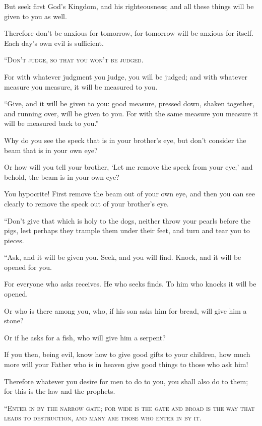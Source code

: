 But seek first God’s Kingdom, and his righteousness; and all these things will be given to you as well.

Therefore don’t be anxious for tomorrow, for tomorrow will be anxious for itself. Each day’s own evil is sufficient.




\lettrine{“}{Don’t judge, so that you won’t be judged.}

For with whatever judgment you judge, you will be judged; and with whatever measure you measure, it will be measured to you.

“Give, and it will be given to you: good measure, pressed down, shaken together, and running over, will be given to you. For with the same measure you measure it will be measured back to you.”

Why do you see the speck that is in your brother’s eye, but don’t consider the beam that is in your own eye?

Or how will you tell your brother, ‘Let me remove the speck from your eye;’ and behold, the beam is in your own eye?

You hypocrite! First remove the beam out of your own eye, and then you can see clearly to remove the speck out of your brother’s eye.

“Don’t give that which is holy to the dogs, neither throw your pearls before the pigs, lest perhaps they trample them under their feet, and turn and tear you to pieces.

“Ask, and it will be given you. Seek, and you will find. Knock, and it will be opened for you.

For everyone who asks receives. He who seeks finds. To him who knocks it will be opened.

Or who is there among you, who, if his son asks him for bread, will give him a stone?

Or if he asks for a fish, who will give him a serpent?

If you then, being evil, know how to give good gifts to your children, how much more will your Father who is in heaven give good things to those who ask him!

Therefore whatever you desire for men to do to you, you shall also do to them; for this is the law and the prophets.




\lettrine{“}{Enter in by the narrow gate; for wide is the gate and broad is the way that leads to destruction, and many are those who enter in by it.}

